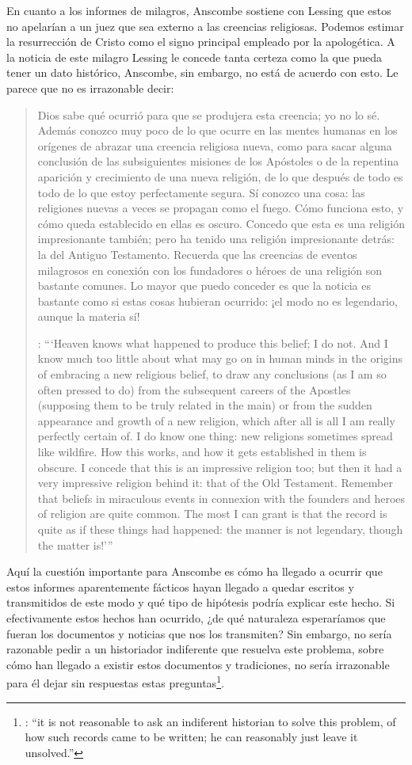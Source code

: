 En cuanto a los informes de milagros, Anscombe sostiene con Lessing que estos no apelarían a un juez que sea externo a las creencias religiosas. Podemos estimar la resurrección de Cristo como el signo principal empleado por la apologética. A la noticia de este milagro Lessing le concede tanta certeza como la que pueda tener un dato histórico, Anscombe, sin embargo, no está de acuerdo con esto. Le parece que no es irrazonable decir: \blockquote[{\cite[26]{anscombe2008faith:prophandmi}}: \enquote{`Heaven knows what happened to produce this belief; I do not. And I know much too little about what may go on in human minds in the origins of embracing a new religious belief, to draw any conclusions (as I am so often pressed to do) from the subsequent careers of the Apostles (supposing them to be truly related in the main) or from the sudden appearance and growth of a new religion, which after all is all I am really perfectly certain of. I do know one thing: new religions sometimes spread like wildfire. How this works, and how it gets established in them is obscure. I concede that this is an impressive religion too; but then it had a very impressive religion behind it: that of the Old Testament. Remember that beliefs in miraculous events in connexion with the founders and heroes of religion are quite common. The most I can grant is that the record is quite as if these things had happened: the manner is not legendary, though the matter is!'}]{Dios sabe qué ocurrió para que se produjera esta creencia; yo no lo sé. Además conozco muy poco de lo que ocurre en las mentes humanas en los orígenes de abrazar una creencia religiosa nueva, como para sacar alguna conclusión \textelp{} de las subsiguientes misiones de los Apóstoles \textelp{} o de la repentina aparición y crecimiento de una nueva religión, de lo que después de todo es todo de lo que estoy perfectamente segura. Sí conozco una cosa: las religiones nuevas a veces se propagan como el fuego. Cómo funciona esto, y cómo queda establecido en ellas es oscuro. Concedo que esta es una religión impresionante también; pero ha tenido una religión impresionante detrás: la del Antiguo Testamento. Recuerda que las creencias de eventos milagrosos en conexión con los fundadores o héroes de una religión son bastante comunes. Lo mayor que puedo conceder es que la noticia es bastante como si estas cosas hubieran ocurrido: ¡el modo no es legendario, aunque la materia sí!}

Aquí la cuestión importante para Anscombe es cómo ha llegado a ocurrir que estos informes aparentemente fácticos hayan llegado a quedar escritos y transmitidos de este modo y qué tipo de hipótesis podría explicar este hecho. Si efectivamente estos hechos han ocurrido, ¿de qué naturaleza esperaríamos que fueran los documentos y noticias que nos los transmiten? Sin embargo, no sería razonable pedir a un historiador indiferente que resuelva este problema, sobre cómo han llegado a existir estos documentos y tradiciones, no sería irrazonable para él dejar sin respuestas estas preguntas\footnote{\cite[Cf.~][37]{anscombe2008faith:prophandmi}: \enquote{it is not reasonable to ask an indiferent historian to solve this problem, of how such records came to be written; he can reasonably just leave it unsolved.}}.

